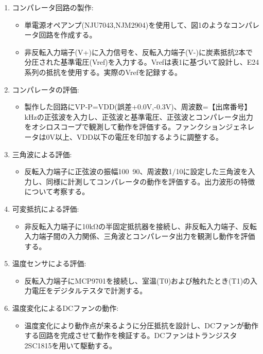 \documentclass[a4paper,11pt,xelatex,ja=standard]{bxjsarticle}
\begin{document}
    \begin{enumerate}
        \item コンパレータ回路の製作:
            \begin{itemize}
                \item 単電源オペアンプ(NJU7043,NJM2904)を使用して、図1のようなコンパレータ回路を作成する。
                \item 非反転入力端子(V+)に入力信号を、反転入力端子(V-)に炭素抵抗2本で分圧された基準電圧(Vref)を入力する。Vrefは表1に基づいて設計し、E24系列の抵抗を使用する。実際のVrefを記録する。
            \end{itemize}
        \item コンパレータの評価:
            \begin{itemize}
                \item 製作した回路にVP-P=VDD(誤差+0.0V,-0.3V)、周波数=【出席番号】kHzの正弦波を入力し、正弦波と基準電圧、正弦波とコンパレータ出力をオシロスコープで観測して動作を評価する。ファンクションジェネレータは0V以上、VDD以下の電圧を印加するように調整する。
            \end{itemize}
        \item 三角波による評価:
            \begin{itemize}
                \item 反転入力端子に正弦波の振幅100~90、周波数1/10に設定した三角波を入力し、同様に計測してコンパレータの動作を評価する。出力波形の特徴について考察する。
            \end{itemize}
        \item 可変抵抗による評価:
            \begin{itemize}
                \item 非反転入力端子に10kΩの半固定抵抗器を接続し、非反転入力端子、反転入力端子間の入力関係、三角波とコンパレータ出力を観測し動作を評価する。
            \end{itemize}
        \item 温度センサによる評価:
            \begin{itemize}
                \item 反転入力端子にMCP9701を接続し、室温(T0)および触れたとき(T1)の入力電圧をデジタルテスタで計測する。
            \end{itemize}
        \item 温度変化によるDCファンの動作:
            \begin{itemize}
                \item 温度変化により動作点が来るように分圧抵抗を設計し、DCファンが動作する回路を完成させて動作を検証する。DCファンはトランジスタ2SC1815を用いて駆動する。
            \end{itemize}
    \end{enumerate}
\end{document}
